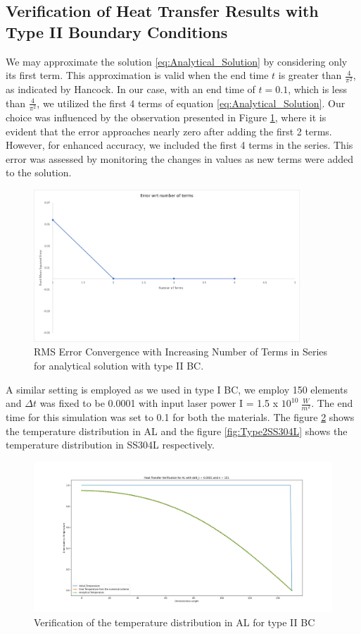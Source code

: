 \subsection{Verification of Heat Transfer Results with Type II Boundary Conditions}
We may approximate the solution \eqref{eq:Analytical_Solution} by considering only its first term. This approximation is valid when the end time $t$ is greater than $\frac{4}{\pi^2}$, as indicated by Hancock\cite{Hancock}. In our case, with an end time of $t = 0.1$, which is less than $\frac{4}{\pi^2}$, we utilized the first 4 terms of equation \eqref{eq:Analytical_Solution}. Our choice was influenced by the observation presented in Figure \ref{fig:meshconvergence_RMS}, where it is evident that the error approaches nearly zero after adding the first 2 terms. However, for enhanced accuracy, we included the first 4 terms in the series. This error was assessed by monitoring the changes in values as new terms were added to the solution.
\begin{figure}[h]
  \centering
  \includegraphics[width=10cm]{img/Error_in_Analytical.png}
  \caption{RMS Error Convergence with Increasing Number of Terms in Series for analytical solution with type II BC.}
  \label{fig:meshconvergence_RMS}
\end{figure}
A similar setting is employed as we used in type I BC, we employ 150 elements and $\Delta t$ was fixed to be 0.0001 with input laser power I = 1.5 x $10^{10} \ \frac{W}{m^2}$. The end time for this simulation was set to 0.1 for both the materials. The figure \ref{fig:Type2} shows the temperature distribution in AL and the figure \ref{fig:Type2SS304L} shows the temperature distribution in SS304L respectively. 
\begin{figure}[h]
  \centering
  \includegraphics[width=15cm]{img/AL_type2.png}
  \caption{Verification of the temperature distribution in AL for type II BC}
  \label{fig:Type2}
\end{figure}
